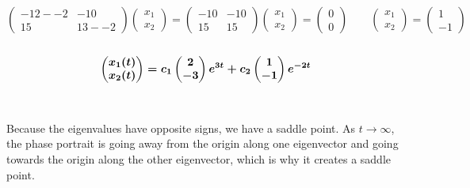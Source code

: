 \documentclass[12pt]{article}
\begin{document}
$$\begin{pmatrix}
-12 - -2  & -10 \\
15 & 13 - -2
\end{pmatrix}
\begin{pmatrix}
x_1 \\
x_2
\end{pmatrix} = 
\begin{pmatrix}
-10 & -10 \\
15 & 15
\end{pmatrix}
\begin{pmatrix}
x_1 \\
x_2
\end{pmatrix} = 
\begin{pmatrix}
0 \\
0
\end{pmatrix} \qquad 
\begin{pmatrix}
x_1 \\
x_2
\end{pmatrix} = 
\begin{pmatrix}
1 \\
-1
\end{pmatrix}$$
\\
$$
\boldmath
\begin{pmatrix}
x_1(t) \\
x_2(t)
\end{pmatrix} = 
c_1
\begin{pmatrix}
2 \\
-3
\end{pmatrix}
e^{3t} + 
c_2
\begin{pmatrix}
1 \\
-1
\end{pmatrix}
e^{-2t}
$$
\\ \\
Because the eigenvalues have opposite signs, we have a saddle point.  As $t \rightarrow \infty$, the phase portrait is going away from the origin along one eigenvector and going towards the origin along the other eigenvector, which is why it creates a saddle point. 
\newpage
\end{document}
